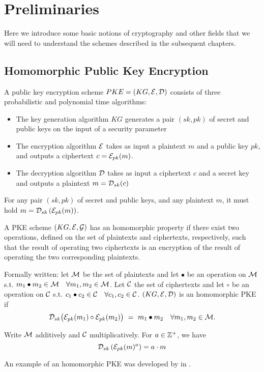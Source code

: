 \chapter{Preliminaries}
\label{chap:pre}
Here we introduce some basic notions of cryptography and other fields that we will need to understand the schemes described in the subsequent chapters.

\section{Homomorphic Public Key Encryption}
A public key encryption scheme $PKE = (KG, \mathcal{E}, \mathcal{D})$ consists of three probabilistic and polynomial time algorithms:
\begin{itemize}[align = left, leftmargin=*, label={--}]
\item The key generation algorithm $KG$ generates a pair $(sk,pk)$ of secret and public keys on the input of a security parameter
\item The encryption algorithm $\mathcal{E}$ takes as input a plaintext $m$ and a public key $pk$, and outputs a ciphertext $c = \mathcal{E}_{pk}(m)$.
\item The decryption algorithm $\mathcal{D}$ takes as input a ciphertext $c$ and a secret key and outputs a plaintext $m = \mathcal{D}_{sk}(c)$
\end{itemize}

For any pair $(sk,pk)$ of secret and public keys, and any plaintext $m$, it must hold $m = \mathcal{D}_{sk} \left( \mathcal{E}_{pk} (m) \right)$.

A PKE scheme $(KG,\mathcal{E},\mathcal{G})$ has an homomorphic property if there exist two operations, defined on the set of plaintexts and ciphertexts, respectively, such that the result of operating two ciphertexts is an encryption of the result of operating the two corresponding plaintexts.

Formally written: let $\mathcal{M}$ be the set of plaintexts and let $\bullet$ be an operation on $\mathcal{M}$ s.t. $m_1 \bullet m_2 \in \mathcal{M} \quad \forall m_1,m_2 \in \mathcal{M}$. Let $\mathcal{C}$ the set of ciphertexts and let $\circ$ be an operation on $\mathcal{C}$ s.t. $c_1 \bullet c_2 \in \mathcal{C} \quad \forall c_1,c_2 \in \mathcal{C}$. $(KG,\mathcal{E},\mathcal{D})$ is an homomorphic PKE if
$$
\mathcal{D}_{sk} \big( \mathcal{E}_{pk}(m_1) \circ \mathcal{E}_{pk}(m_2) \big) \ = \ m_1 \bullet m_2 \quad \forall m_1,m_2 \in \mathcal{M}.
$$

Write $\mathcal{M}$ additively and $\mathcal{C}$ multiplicatively. For $a \in {\mathbb Z}^+$, we have $$\mathcal{D}_{sk} \left( \mathcal{E}_{pk} (m)^a \right) = a \cdot m$$

An example of an homomorphic PKE was developed by \citeauthor{elGamal85} in \cite{elGamal85}.


